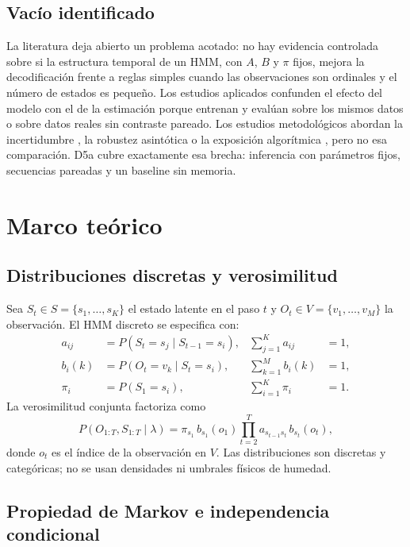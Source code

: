 \documentclass[11pt,letterpaper]{article}
\begin{document}
\subsection{Vacío identificado}

La literatura deja abierto un problema acotado: no hay evidencia controlada sobre si la estructura temporal de un HMM, con \(A\), \(B\) y \(\pi\) fijos, mejora la decodificación frente a reglas simples cuando las observaciones son ordinales y el número de estados es pequeño. Los estudios aplicados confunden el efecto del modelo con el de la estimación porque entrenan y evalúan sobre los mismos datos o sobre datos reales sin contraste pareado. Los estudios metodológicos abordan la incertidumbre \cite{nicosia2026}, la robustez asintótica \cite{pouzo2025} o la exposición algorítmica \cite{rabiner1989,baum1970}, pero no esa comparación. D5a cubre exactamente esa brecha: inferencia con parámetros fijos, secuencias pareadas y un baseline sin memoria.

\section{Marco teórico}

\subsection{Distribuciones discretas y verosimilitud}

Sea \(S_t\in S=\{s_1,\dots,s_K\}\) el estado latente en el paso \(t\) y \(O_t\in V=\{v_1,\dots,v_M\}\) la observación. El HMM discreto se especifica con:
\begin{align}
a_{ij} &= P(S_t=s_j\mid S_{t-1}=s_i), & \sum_{j=1}^{K}a_{ij}&=1,\\
b_i(k) &= P(O_t=v_k\mid S_t=s_i), & \sum_{k=1}^{M}b_i(k)&=1,\\
\pi_i &= P(S_1=s_i), & \sum_{i=1}^{K}\pi_i&=1.
\end{align}
La verosimilitud conjunta factoriza como
\begin{equation}
P(O_{1:T},S_{1:T}\mid\lambda)
=\pi_{s_1}\,b_{s_1}(o_1)\prod_{t=2}^{T}a_{s_{t-1}s_t}\,b_{s_t}(o_t),
\end{equation}
donde \(o_t\) es el índice de la observación en \(V\). Las distribuciones son discretas y categóricas; no se usan densidades ni umbrales físicos de humedad.

\subsection{Propiedad de Markov e independencia condicional}
\end{document}
